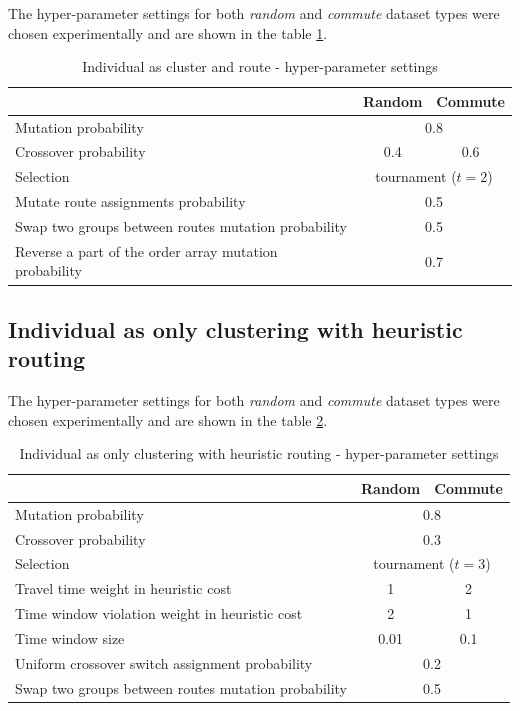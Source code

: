 The hyper-parameter settings for both \textit{random} and \textit{commute} dataset types were chosen experimentally and are shown in the table \ref{tab:evo_cr_hyperparams}.

\begin{table}[h]
    \centering
    \begin{tabular}{lcc}
         & Random & Commute \\
        \hline
        Mutation probability & \multicolumn{2}{c}{0.8} \\
        Crossover probability & 0.4 & 0.6 \\
        Selection & \multicolumn{2}{c}{tournament ($t=2$)} \\
        Mutate route assignments probability & \multicolumn{2}{c}{0.5} \\
        Swap two groups between routes mutation probability & \multicolumn{2}{c}{0.5} \\
        Reverse a part of the order array mutation probability & \multicolumn{2}{c}{0.7} \\ 
    \end{tabular}
    \caption{Individual as cluster and route - hyper-parameter settings}
    \label{tab:evo_cr_hyperparams}
\end{table}

\subsection{Individual as only clustering with heuristic routing}

The hyper-parameter settings for both \textit{random} and \textit{commute} dataset types were chosen experimentally and are shown in the table \ref{tab:evo_ch_hyperparams}.

\begin{table}[ht]
    \centering
    \begin{tabular}{lcc}
         & Random & Commute \\
        \hline
        Mutation probability & \multicolumn{2}{c}{0.8} \\
        Crossover probability & \multicolumn{2}{c}{0.3} \\
        Selection & \multicolumn{2}{c}{tournament ($t=3$)} \\
        Travel time weight in heuristic cost & 1 & 2 \\
        Time window violation weight in heuristic cost & 2 & 1 \\
        Time window size & 0.01 & 0.1 \\
        Uniform crossover switch assignment probability & \multicolumn{2}{c}{0.2} \\
        Swap two groups between routes mutation probability & \multicolumn{2}{c}{0.5} \\
    \end{tabular}
    \caption{Individual as only clustering with heuristic routing - hyper-parameter settings}
    \label{tab:evo_ch_hyperparams}
\end{table}